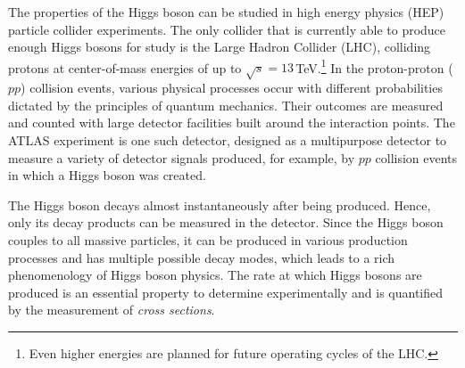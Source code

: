 The properties of the Higgs boson can be studied in high energy physics (HEP) particle collider experiments. 
The only collider that is currently able to produce enough Higgs bosons for study is the Large Hadron Collider (LHC), colliding protons at center-of-mass energies of up to $\sqrt{s} = 13\,$TeV.\footnote{Even higher energies are planned for future operating cycles of the LHC.}
In the proton-proton ($pp$) collision events, various physical processes occur with different probabilities dictated by the principles of quantum mechanics.
Their outcomes are measured and counted with large detector facilities built around the interaction points. 
The ATLAS experiment is one such detector, designed as a multipurpose detector to measure a variety of detector signals produced, for example, by $pp$ collision events in which a Higgs boson was created.

The Higgs boson decays almost instantaneously after being produced. Hence, only its decay products can be measured in the detector. 
Since the Higgs boson couples to all massive particles, it can be produced in various production processes and has multiple possible decay modes, which leads to a rich phenomenology of Higgs boson physics. 
The rate at which Higgs bosons are produced is an essential property to determine experimentally and is quantified by the measurement of \emph{cross sections}. 

